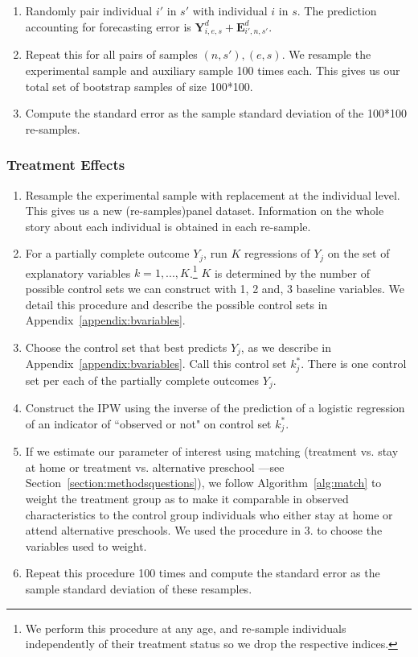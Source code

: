 \begin{enumerate}
\item Randomly pair individual $i'$ in $s'$ with individual $i$ in $s$. The prediction accounting for forecasting error is $\bm{Y}_{i,e,s}^d + \bm{E}_{i',n,s'}^d$. 

\item Repeat this for all pairs of samples $(n,s'), (e,s)$. We resample the experimental sample and auxiliary sample 100 times each. This gives us our total set of bootstrap samples of size 100*100.

\item Compute the standard error as the sample standard deviation of the 100*100 re-samples.

\end{enumerate}

\subsubsection{Treatment Effects}

\begin{enumerate}

\item Resample the experimental sample with replacement at the individual level. This gives us a new (re-samples)panel dataset. Information on the whole story about each individual is obtained in each re-sample. 

\item For a partially complete outcome $Y_{j}$, run $K$ regressions of $Y_{j}$ on the set of explanatory variables $k = 1,..., K$.\footnote{We perform this procedure at any age, and re-sample individuals independently of their treatment status so we drop the respective indices.} $K$ is determined by the number of possible control sets we can construct with 1, 2 and, 3 baseline variables. We detail this procedure and describe the possible control sets in Appendix~\ref{appendix:bvariables}.

\item Choose the control set that best predicts $Y_{j}$, as we describe in Appendix~\ref{appendix:bvariables}. Call this control set $k^*_{j}$. There is one control set per each of the partially complete outcomes $Y_{j}$. 

\item Construct the IPW using the inverse of the prediction of  a logistic regression of an indicator of ``observed or not" on control set $k^*_{j}$. 

\item If we estimate our parameter of interest using  matching (treatment vs. stay at home or treatment vs. alternative preschool ---see Section~\ref{section:methodsquestions}), we follow Algorithm~\ref{alg:match} to weight the treatment group as to make it comparable in observed characteristics to the control group individuals who either stay at home or attend alternative preschools. We used the procedure in 3. to choose the variables used to weight.

\item Repeat this procedure 100 times and compute the standard error as the sample standard deviation of these resamples. 

\end{enumerate}

